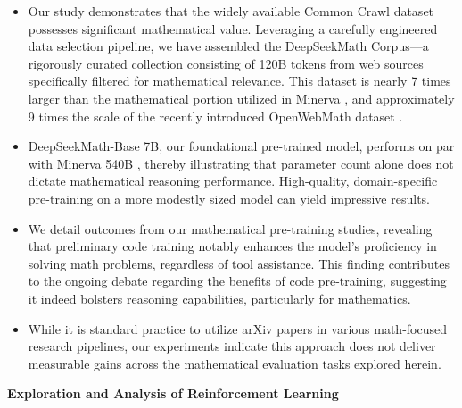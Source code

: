 \begin{itemize}[topsep=0pt]
    \item Our study demonstrates that the widely available Common Crawl dataset possesses significant mathematical value. Leveraging a carefully engineered data selection pipeline, we have assembled the DeepSeekMath Corpus—a rigorously curated collection consisting of 120B tokens from web sources specifically filtered for mathematical relevance. This dataset is nearly 7 times larger than the mathematical portion utilized in Minerva \citep{minerva}, and approximately 9 times the scale of the recently introduced OpenWebMath dataset \citep{openwebmath}.

    \item DeepSeekMath-Base 7B, our foundational pre-trained model, performs on par with Minerva 540B \citep{minerva}, thereby illustrating that parameter count alone does not dictate mathematical reasoning performance. High-quality, domain-specific pre-training on a more modestly sized model can yield impressive results.

    \item We detail outcomes from our mathematical pre-training studies, revealing that preliminary code training notably enhances the model's proficiency in solving math problems, regardless of tool assistance. This finding contributes to the ongoing debate regarding the benefits of code pre-training, suggesting it indeed bolsters reasoning capabilities, particularly for mathematics.

    \item While it is standard practice to utilize arXiv papers in various math-focused research pipelines, our experiments indicate this approach does not deliver measurable gains across the mathematical evaluation tasks explored herein.
\end{itemize}

\textbf{Exploration and Analysis of Reinforcement Learning}

